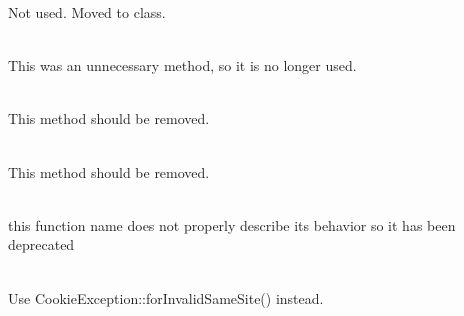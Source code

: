 \begin{DoxyRefList}
\label{deprecated__deprecated000108}%
%
Not used. Moved to  class.  
\item[Member \doxylink{class_code_igniter_1_1_router_1_1_router_a8cb1fbe6f3edc10082dcd56ac095e4fd}{Code\+Igniter\textbackslash{}Router\textbackslash{}Router\+::set\+Default\+Controller} ()]\hfill \\
\label{deprecated__deprecated000111}%
%
This was an unnecessary method, so it is no longer used. 
\item[Member \doxylink{class_code_igniter_1_1_router_1_1_router_a4fc314ad10043efb5103d66ac40b6bdd}{Code\+Igniter\textbackslash{}Router\textbackslash{}Router\+::set\+Directory} (?string \$dir=null, bool \$append=false, bool \$validate=true)]\hfill \\
\label{deprecated__deprecated000109}%
%
This method should be removed.  
\item[Member \doxylink{class_code_igniter_1_1_router_1_1_router_a64c69694b5d1bdb45588098993e27b72}{Code\+Igniter\textbackslash{}Router\textbackslash{}Router\+::set\+Translate\+URIDashes} (bool \$val=false)]\hfill \\
\label{deprecated__deprecated000106}%
%
This method should be removed.  
\item[Member \doxylink{class_code_igniter_1_1_router_1_1_router_a006592f13bf68bf9baeecbc3edb6d96a}{Code\+Igniter\textbackslash{}Router\textbackslash{}Router\+::validate\+Request} (array \$segments)]\hfill \\
\label{deprecated__deprecated000107}%
%
this function name does not properly describe its behavior so it has been deprecated 
\item[Member \doxylink{class_code_igniter_1_1_security_1_1_exceptions_1_1_security_exception_acd0a77055a596cfe93465806bf3a0c74}{Code\+Igniter\textbackslash{}Security\textbackslash{}Exceptions\textbackslash{}Security\+Exception\+::for\+Invalid\+Same\+Site} (string \$samesite)]\hfill \\
\label{deprecated__deprecated000112}%
%
Use {\ttfamily Cookie\+Exception\+::for\+Invalid\+Same\+Site()} instead. 
\item[Member \doxylink{class_code_igniter_1_1_session_1_1_exceptions_1_1_session_exception_a1f71dcf57376cfd15be32e5c3c7b1cba}{Code\+Igniter\textbackslash{}Session\textbackslash{}Exceptions\textbackslash{}Session\+Exception\+::for\+Invalid\+Same\+Site\+Setting} (string \$samesite)]\hfill \\
\label{deprecated__deprecated000121}%
%
 

\end{DoxyRefList}
